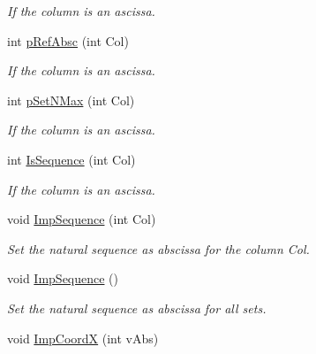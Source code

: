 \begin{DoxyCompactItemize}
\begin{DoxyCompactList}\small\item\em If the column is an ascissa. \end{DoxyCompactList}\item 
int \hyperlink{classVarDatFile_a79be07c83bc49d7f5e55c64944ed6304}{p\+Ref\+Absc} (int Col)\hypertarget{classVarDatFile_a79be07c83bc49d7f5e55c64944ed6304}{}\label{classVarDatFile_a79be07c83bc49d7f5e55c64944ed6304}

\begin{DoxyCompactList}\small\item\em If the column is an ascissa. \end{DoxyCompactList}\item 
int \hyperlink{classVarDatFile_a0b6ccc25f21f2a83096da6af6ea943e3}{p\+Set\+N\+Max} (int Col)\hypertarget{classVarDatFile_a0b6ccc25f21f2a83096da6af6ea943e3}{}\label{classVarDatFile_a0b6ccc25f21f2a83096da6af6ea943e3}

\begin{DoxyCompactList}\small\item\em If the column is an ascissa. \end{DoxyCompactList}\item 
int \hyperlink{classVarDatFile_a5c788a95c78a3da32eaac2f2f994de58}{Is\+Sequence} (int Col)\hypertarget{classVarDatFile_a5c788a95c78a3da32eaac2f2f994de58}{}\label{classVarDatFile_a5c788a95c78a3da32eaac2f2f994de58}

\begin{DoxyCompactList}\small\item\em If the column is an ascissa. \end{DoxyCompactList}\item 
void \hyperlink{classVarDatFile_a00eaf560508e46c0949042ab38af99de}{Imp\+Sequence} (int Col)\hypertarget{classVarDatFile_a00eaf560508e46c0949042ab38af99de}{}\label{classVarDatFile_a00eaf560508e46c0949042ab38af99de}

\begin{DoxyCompactList}\small\item\em Set the natural sequence as abscissa for the column Col. \end{DoxyCompactList}\item 
void \hyperlink{classVarDatFile_ad0ccdbdedaf66f5c01e3b850148a6b00}{Imp\+Sequence} ()\hypertarget{classVarDatFile_ad0ccdbdedaf66f5c01e3b850148a6b00}{}\label{classVarDatFile_ad0ccdbdedaf66f5c01e3b850148a6b00}

\begin{DoxyCompactList}\small\item\em Set the natural sequence as abscissa for all sets. \end{DoxyCompactList}\item 
void \hyperlink{classVarDatFile_a963c1d12c9e593a16748f229bc5bd11f}{Imp\+CoordX} (int v\+Abs)\hypertarget{classVarDatFile_a963c1d12c9e593a16748f229bc5bd11f}{}\label{classVarDatFile_a963c1d12c9e593a16748f229bc5bd11f}


\end{DoxyCompactItemize}
